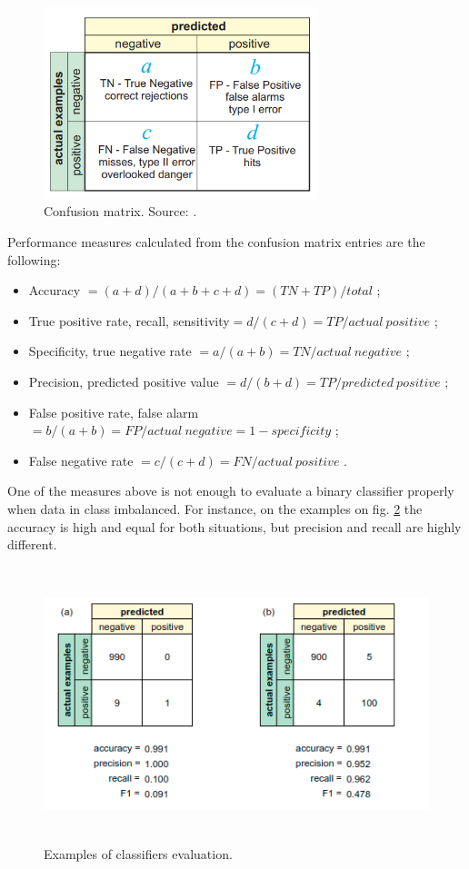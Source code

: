 \begin{figure}[h]
    \centering
    \includegraphics[width=8cm]{Images/Confusion-matrix.png}
    \caption{Confusion matrix. Source: \citep{kohavi:glossary}.}
    \label{fig:confusion-matrix}
\end{figure}

Performance measures calculated from the confusion matrix entries are the following:
\begin{itemize}
    \item Accuracy $= (a + d)/(a + b + c + d) =
    (TN + TP)/total$ ;
    \item True positive rate, recall, sensitivity$ =
    d/(c + d) = TP/actual\: positive$ ;
    \item Specificity, true negative rate $= a/(a + b) =
    TN/actual\: negative$ ; 
    \item Precision, predicted positive value $=
    d/(b + d) = TP/predicted\: positive$ ;
    \item False positive rate, false alarm $= b/(a + b)
    = FP/actual\: negative = 1 - specificity$ ;
    \item False negative rate $= c/(c + d) = FN/actual\: positive$ .
\end{itemize}

One of the measures above is not enough to evaluate a binary classifier properly when data in class imbalanced. For instance, on the examples on fig. \ref{fig:classifiers-evaluation} the accuracy is high and equal for both situations, but precision and recall are highly different. 


\begin{figure}[h]
    \centering
    \includegraphics[height=8cm]{Images/Classifiers-evaluation.png}
    \caption{Examples of classifiers evaluation.}
    \label{fig:classifiers-evaluation}
\end{figure}

